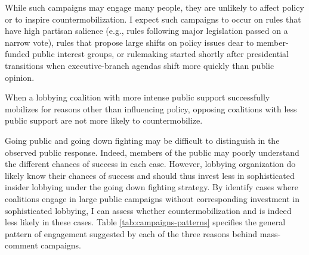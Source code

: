 \documentclass[
      12pt,
        ]{article}
\begin{document}
While such campaigns may engage many people, they are unlikely to affect
policy or to inspire countermobilization. I expect such campaigns to
occur on rules that have high partisan salience (e.g., rules following
major legislation passed on a narrow vote), rules that propose large
shifts on policy issues dear to member-funded public interest groups, or
rulemaking started shortly after presidential transitions when
executive-branch agendas shift more quickly than public opinion.

When a lobbying coalition with more intense public support successfully
mobilizes for reasons other than influencing policy, opposing coalitions
with less public support are not more likely to countermobilize.

Going public and going down fighting may be difficult to distinguish in
the observed public response. Indeed, members of the public may poorly
understand the different chances of success in each case. However,
lobbying organization do likely know their chances of success and should
thus invest less in sophisticated insider lobbying under the going down
fighting strategy. By identify cases where coalitions engage in large
public campaigns without corresponding investment in sophisticated
lobbying, I can assess whether countermobilization and is indeed less
likely in these cases. Table
\ref{tab:campaigns-patterns} specifies the general pattern of
engagement suggested by each of the three reasons behind mass-comment
campaigns.
\end{document}
